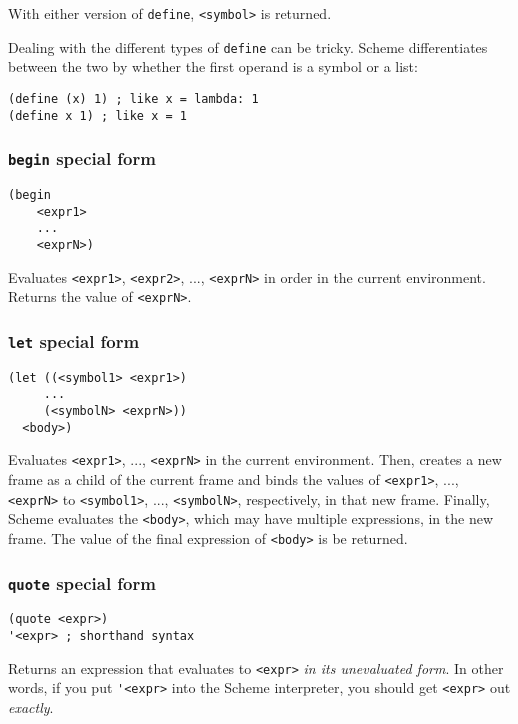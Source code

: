 With either version of \lstinline{define}, \lstinline{<symbol>} is returned. 

Dealing with the different types of \lstinline{define} can be tricky. Scheme differentiates between the two by whether the first operand is a symbol or a list:  
\begin{lstlisting}
(define (x) 1) ; like x = lambda: 1
(define x 1) ; like x = 1
\end{lstlisting}

\subsubsection{\lstinline{begin} special form}
\begin{lstlisting}
(begin 
    <expr1>
    ... 
    <exprN>) 
\end{lstlisting}
Evaluates \lstinline{<expr1>}, \lstinline{<expr2>}, ..., \lstinline{<exprN>} in order in the current environment. Returns the value of \lstinline{<exprN>}. 

\subsubsection{\lstinline{let} special form}
\begin{lstlisting}
(let ((<symbol1> <expr1>) 
     ... 
     (<symbolN> <exprN>)) 
  <body>) 
\end{lstlisting}
Evaluates \lstinline{<expr1>}, ..., \lstinline{<exprN>} in the current environment. Then, creates a new frame as a child of the current frame and binds the values of \lstinline{<expr1>}, ..., \lstinline{<exprN>} to \lstinline{<symbol1>}, ..., \lstinline{<symbolN>}, respectively, in that new frame. Finally, Scheme evaluates the \lstinline{<body>}, which may have multiple expressions, in the new frame. The value of the final expression of \lstinline{<body>} is be returned. 

\subsubsection{\lstinline{quote} special form}
\begin{lstlisting}
(quote <expr>)
'<expr> ; shorthand syntax
\end{lstlisting}
Returns an expression that evaluates to \lstinline{<expr>} \textit{in its unevaluated form}. In other words, if you put \lstinline{'<expr>} into the Scheme interpreter, you should get \lstinline{<expr>} out \textit{exactly}. 

